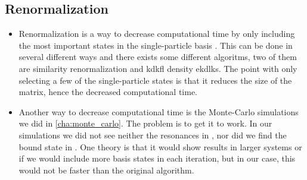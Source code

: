 \documentclass[../main/report.tex]{subfiles}
\begin{document}
\subsection{Renormalization}
  \begin{itemize}
    \item Renormalization is a way to decrease computational time by only including the most important states in the single-particle basis \cite{DMRG}.
    This can be done in several different ways and there exists some different algoritms, two of them are similarity renormalization and kdkfl density ekdlks.
    The point with only selecting a few of the single-particle states is that it reduces the size of the matrix, hence the decreased computational time.
    \item Another way to decrease computational time is the Monte-Carlo simulations we did in \cref{cha:monte_carlo}.
    The problem is to get it to work.
    In our simulations we did not see neither the resonances in , nor did we find the bound state in .
    One theory is that it would show results in larger systems or if we would include more basis states in each iteration, but in our case, this would not be faster than the original algorithm.
  \end{itemize}
\end{document}
